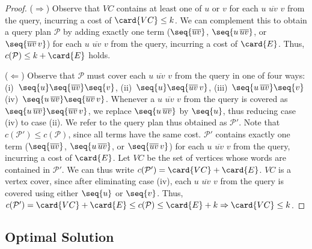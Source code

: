 \begin{proof}{}
  ($\Rightarrow$) Observe that $VC$ contains at least one of $u$ or
  $v$ for each $u\,\,\overline{uv}\,\,v$ from the query, incurring a
  cost of $\card{VC} \le k$. We can complement this to obtain a query
  plan $\mathcal{P}$ by adding exactly one term
  ($\seq{\overline{uv}}$, $\seq{u\,\overline{uv}}$, or
  $\seq{\overline{uv}\,v}$) for each $u\,\,\overline{uv}\,\,v$ from
  the query, incurring a cost of $\card{E}$. Thus,
  $c(\mathcal{P}) \le k + \card{E}$ holds.

  ($\Leftarrow$) Observe that $\mathcal{P}$ must cover each
  $u\,\,\overline{uv}\,\,v$ from the query in one of four ways:
  (i)~$\seq{u} \seq{\overline{uv}} \seq{v}$,
  (ii)~$\seq{u} \seq{\overline{uv}\,v}$,
  (iii)~$\seq{u\,\overline{uv}} \seq{v}$
  (iv)~$\seq{u\,\overline{uv}} \seq{\overline{uv}\,v}$. Whenever a
  $u\,\,\overline{uv}\,\,v$ from the query is covered as
  $\seq{u\,\overline{uv}} \seq{\overline{uv}\,v}$, we replace
  $\seq{u\,\overline{uv}}$ by $\seq{u}$, thus reducing case (iv) to
  case (ii). We refer to the query plan thus obtained as
  $\mathcal{P'}$. Note that $c(\mathcal{P}') \le c(\mathcal{P})$,
  since all terms have the same cost. $\mathcal{P}'$ contains exactly
  one term ($\seq{\overline{uv}}$, $\seq{u\,\overline{uv}}$, or
  $\seq{\overline{uv}\,v}$) for each $u\,\,\overline{uv}\,\,v$ from
  the query, incurring a cost of $\card{E}$. Let $VC$ be the set of
  vertices whose words are contained in $\mathcal{P}'$. We can thus
  write $c(\mathcal{P}') = \card{VC} + \card{E}$. $VC$ is a vertex
  cover, since after eliminating case (iv), each
  $u\,\,\overline{uv}\,\,v$ from the query is covered using either
  $\seq{u}$ or $\seq{v}$. Thus,
  $c(\mathcal{P}') = \card{VC} + \card{E} \le c(\mathcal{P}) \le
  \card{E} + k \Rightarrow \card{VC} \le k$.
\end{proof}

\subsection{Optimal Solution}
\label{sec:optimal-solution}

